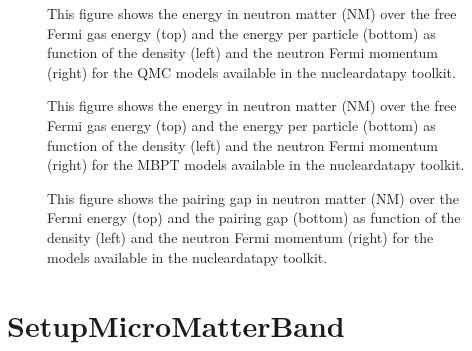 \documentclass[letterpaper,10pt,english]{sphinxmanual}
\begin{document}
\begin{figure}[htbp]
\centering
\capstart

\noindent{}
\caption{This figure shows the energy in neutron matter (NM) over the free Fermi gas energy (top) and the energy per particle (bottom) as function of the density (left) and the neutron Fermi momentum (right) for the QMC models available in the nucleardatapy toolkit.}\label{\detokenize{source/api/setup_micro_matter:id4}}\end{figure}

\begin{figure}[htbp]
\centering
\capstart

\noindent{}
\caption{This figure shows the energy in neutron matter (NM) over the free Fermi gas energy (top) and the energy per particle (bottom) as function of the density (left) and the neutron Fermi momentum (right) for the MBPT models available in the nucleardatapy toolkit.}\label{\detokenize{source/api/setup_micro_matter:id5}}\end{figure}

\begin{figure}[htbp]
\centering
\capstart

\noindent{}
\caption{This figure shows the pairing gap in neutron matter (NM) over the Fermi energy (top) and the pairing gap (bottom) as function of the density (left) and the neutron Fermi momentum (right) for the models available in the nucleardatapy toolkit.}\label{\detokenize{source/api/setup_micro_matter:id6}}\end{figure}

\sphinxstepscope


\section{SetupMicroMatterBand}
\label{\detokenize{source/api/setup_micro_matter_band:setupmicromatterband}}\label{\detokenize{source/api/setup_micro_matter_band::doc}}\label{\detokenize{source/api/setup_micro_matter_band:module-nucleardatapy.setup_micro_matter_band}}
\end{document}
